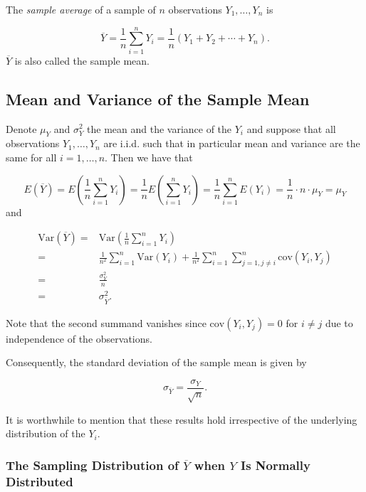 \documentclass[]{book}
\theoremstyle{definition}
\theoremstyle{definition}
\theoremstyle{definition}
\theoremstyle{remark}
\begin{document}
The \emph{sample average} of a sample of \(n\) observations
\(Y_1, \dots, Y_n\) is

\[ \overline{Y} = \frac{1}{n} \sum_{i=1}^n Y_i = \frac{1}{n} (Y_1 + Y_2 + \cdots + Y_n). \]
\(\overline{Y}\) is also called the sample mean.

\subsection*{Mean and Variance of the Sample
Mean}\label{mean-and-variance-of-the-sample-mean}

Denote \(\mu_Y\) and \(\sigma_Y^2\) the mean and the variance of the
\(Y_i\) and suppose that all observations \(Y_1,\dots,Y_n\) are i.i.d.
such that in particular mean and variance are the same for all
\(i=1,\dots,n\). Then we have that

\[ E(\overline{Y}) = E\left(\frac{1}{n} \sum_{i=1}^n Y_i \right) = \frac{1}{n} E\left(\sum_{i=1}^n Y_i\right) = \frac{1}{n} \sum_{i=1}^n E\left(Y_i\right) = \frac{1}{n} \cdot n \cdot \mu_Y = \mu_Y    \]
and

\begin{align}
  \text{Var}(\overline{Y}) =& \text{Var}\left(\frac{1}{n} \sum_{i=1}^n Y_i \right) \\
  =& \frac{1}{n^2} \sum_{i=1}^n \text{Var}(Y_i) + \frac{1}{n^2} \sum_{i=1}^n \sum_{j=1, j\neq i}^n \text{cov}(Y_i,Y_j) \\
  =& \frac{\sigma^2_Y}{n} \\
  =& \sigma_{\overline{Y}}^2.
\end{align}

Note that the second summand vanishes since \(\text{cov}(Y_i,Y_j)=0\)
for \(i\neq j\) due to independence of the observations.

Consequently, the standard deviation of the sample mean is given by

\[ \sigma_{\overline{Y}} = \frac{\sigma_Y}{\sqrt{n}}. \]

It is worthwhile to mention that these results hold irrespective of the
underlying distribution of the \(Y_i\).

\subsubsection*{\texorpdfstring{The Sampling Distribution of
\(\overline{Y}\) when \(Y\) Is Normally
Distributed}{The Sampling Distribution of \textbackslash{}overline\{Y\} when Y Is Normally Distributed}}\label{the-sampling-distribution-of-overliney-when-y-is-normally-distributed}
\end{document}
